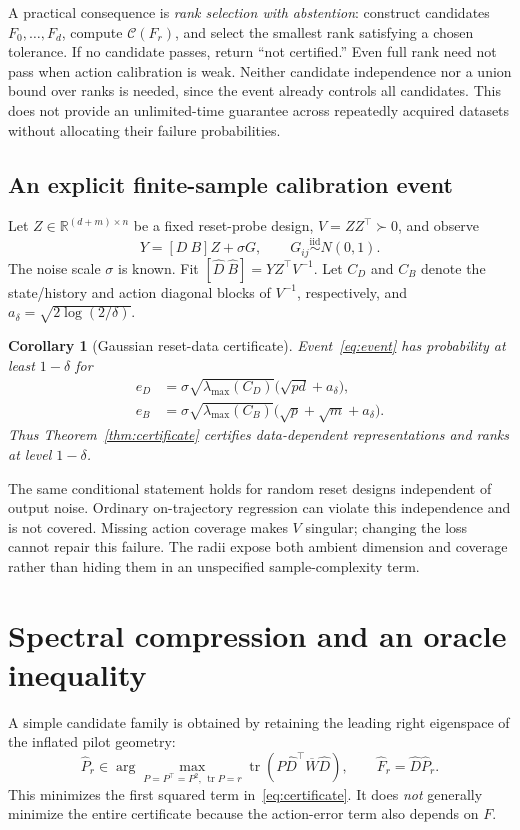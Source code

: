 \documentclass{article}
\newtheorem{corollary}[theorem]{Corollary}
\newcommand{\R}{\mathbb R}
\newcommand{\tr}{\operatorname{tr}}
\begin{document}
A practical consequence is \emph{rank selection with abstention}: construct candidates $F_0,\ldots,F_d$, compute $\mathcal C(F_r)$, and select the smallest rank satisfying a chosen tolerance. If no candidate passes, return ``not certified.'' Even full rank need not pass when action calibration is weak. Neither candidate independence nor a union bound over ranks is needed, since the event already controls all candidates. This does not provide an unlimited-time guarantee across repeatedly acquired datasets without allocating their failure probabilities.

\subsection{An explicit finite-sample calibration event}
Let $Z\in\R^{(d+m)\times n}$ be a fixed reset-probe design, $V=ZZ^\top\succ0$, and observe
\begin{equation}\label{eq:data}
 Y=[D\ B]Z+\sigma G,\qquad G_{ij}\stackrel{\mathrm{iid}}\sim N(0,1).
\end{equation}
The noise scale $\sigma$ is known. Fit $[\widehat D\ \widehat B]=YZ^\top V^{-1}$. Let $C_D$ and $C_B$ denote the state/history and action diagonal blocks of $V^{-1}$, respectively, and $a_\delta=\sqrt{2\log(2/\delta)}$.

\begin{corollary}[Gaussian reset-data certificate]\label{cor:gaussian}
Event~\eqref{eq:event} has probability at least $1-\delta$ for
\begin{align}
 e_D&=\sigma\sqrt{\lambda_{\max}(C_D)}\big(\sqrt{pd}+a_\delta\big),\label{eq:ed}\\
 e_B&=\sigma\sqrt{\lambda_{\max}(C_B)}\big(\sqrt p+\sqrt m+a_\delta\big).\label{eq:eb}
\end{align}
Thus Theorem~\ref{thm:certificate} certifies data-dependent representations and ranks at level $1-\delta$.
\end{corollary}
The same conditional statement holds for random reset designs independent of output noise. Ordinary on-trajectory regression can violate this independence and is not covered. Missing action coverage makes $V$ singular; changing the loss cannot repair this failure. The radii expose both ambient dimension and coverage rather than hiding them in an unspecified sample-complexity term.

\section{Spectral compression and an oracle inequality}
A simple candidate family is obtained by retaining the leading right eigenspace of the inflated pilot geometry:
\begin{equation}\label{eq:algorithm}
 \widehat P_r\in\arg\max_{P=P^\top=P^2,\,\tr P=r}
       \tr(P\widehat D^\top\overline W\widehat D),\qquad
 \widehat F_r=\widehat D\widehat P_r.
\end{equation}
This minimizes the first squared term in~\eqref{eq:certificate}. It does \emph{not} generally minimize the entire certificate because the action-error term also depends on $F$.
\end{document}
